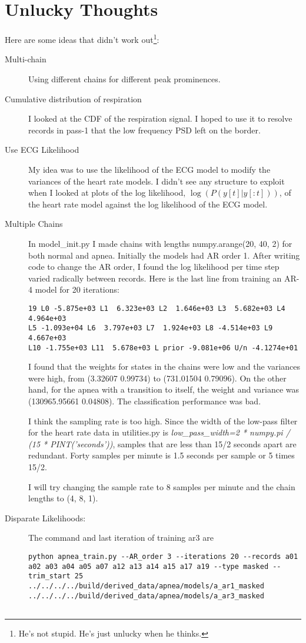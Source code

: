 \documentclass[12pt]{article}
\begin{document}
\section{Unlucky Thoughts}
\label{sec:unlucky}

Here are some ideas that didn't work out\footnote{He's not stupid.
  He's just unlucky when he thinks.}:
\begin{description}
\item[Multi-chain] Using different chains for different peak prominences.
\item[Cumulative distribution of respiration] I looked at the CDF of
  the respiration signal.  I hoped to use it to resolve records in
  pass-1 that the low frequency PSD left on the border.
\item[Use ECG Likelihood] My idea was to use the likelihood of the ECG
  model to modify the variances of the heart rate models.  I didn't
  see any structure to exploit when I looked at plots of the log
  likelihood, $\log\left(P(y[t]|y[:t]) \right)$, of the heart rate
  model against the log likelihood of the ECG model.
\item[Multiple Chains] In model\_init.py I made chains with lengths
  numpy.arange(20, 40, 2) for both normal and apnea.  Initially the
  models had AR order 1.  After writing code to change the AR order, I
  found the log likelihood per time step varied radically between
  records.  Here is the last line from training an AR-4 model for 20
  iterations:
\begin{verbatim}
19 L0 -5.875e+03 L1  6.323e+03 L2  1.646e+03 L3  5.682e+03 L4  4.964e+03
L5 -1.093e+04 L6  3.797e+03 L7  1.924e+03 L8 -4.514e+03 L9  4.667e+03
L10 -1.755e+03 L11  5.678e+03 L prior -9.081e+06 U/n -4.1274e+01
\end{verbatim}
  I found that the weights for states in the chains were low and the
  variances were high, from (3.32607 0.99734) to (731.01504 0.79096).
  On the other hand, for the apnea with a transition to itself, the
  weight and variance was (130965.95661 0.04808).  The classification
  performance was bad.

  I think the sampling rate is too high.  Since the width of the
  low-pass filter for the heart rate data in utilities.py is
  \emph{low\_pass\_width=2 * numpy.pi / (15 * PINT('seconds'))},
  samples that are less than 15/2 seconds apart are redundant.  Forty
  samples per minute is 1.5 seconds per sample or 5 times 15/2.

  I will try changing the sample rate to 8 samples per minute and the
  chain lengths to (4, 8, 1).
\item[Disparate Likelihoods:] The command and last iteration of
  training ar3 are
\begin{verbatim}
python apnea_train.py --AR_order 3 --iterations 20 --records a01 a02 a03 a04 a05 a07 a12 a13 a14 a15 a17 a19 --type masked --trim_start 25 ../../../../build/derived_data/apnea/models/a_ar1_masked ../../../../build/derived_data/apnea/models/a_ar3_masked


\end{verbatim}
\end{description}
\end{document}
